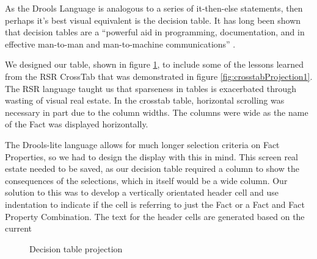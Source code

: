 As the Drools Language is analogous to a series of it-then-else statements, then perhaps it's best visual equivalent is the decision table.
It has long been shown that decision tables are a ``powerful aid in programming, documentation, and in effective man-to-man and man-to-machine communications'' \cite{pooch1974translation}.

We designed our table, shown in figure \ref{fig:decisionTableProjection}, to include some of the lessons learned from the RSR CrossTab that was demonstrated in figure \ref{fig:crosstabProjection1}.
The RSR language taught us that sparseness in tables is exacerbated through wasting of visual real estate.
In the crosstab table, horizontal scrolling was necessary in part due to the column widths.
The columns were wide as the name of the Fact was displayed horizontally.

The Drools-lite language allows for much longer selection criteria on Fact Properties, so we had to design the display with this in mind.
This screen real estate needed to be saved, as our decision table required a column to show the consequences of the selections, which in itself would be a wide column.
Our solution to this was to develop a vertically orientated header cell and use indentation to indicate if the cell is referring to just the Fact or a Fact and Fact Property Combination.
The text for the header cells are generated based on the current


\begin{figure}[h]
    \centering
    \caption{Decision table projection}
    \label{fig:decisionTableProjection}
\end{figure}

